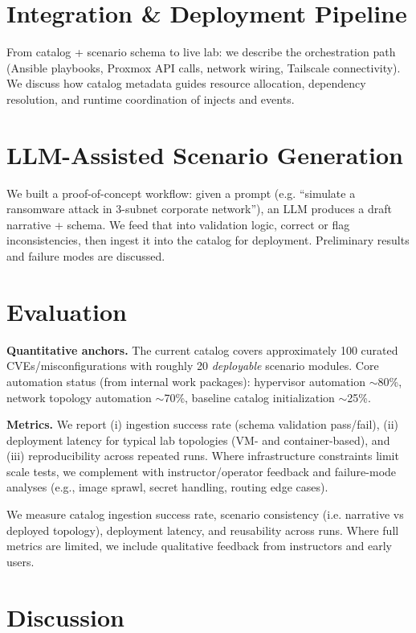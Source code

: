 \documentclass[11pt]{article}
\begin{document}
\section{Integration \& Deployment Pipeline}
From catalog + scenario schema to live lab: we describe the orchestration path (Ansible playbooks, Proxmox API calls, network wiring, Tailscale connectivity). We discuss how catalog metadata guides resource allocation, dependency resolution, and runtime coordination of injects and events.

\section{LLM-Assisted Scenario Generation}
We built a proof-of-concept workflow: given a prompt (e.g. “simulate a ransomware attack in 3-subnet corporate network”), an LLM produces a draft narrative + schema. We feed that into validation logic, correct or flag inconsistencies, then ingest it into the catalog for deployment. Preliminary results and failure modes are discussed.

\section{Evaluation}

\textbf{Quantitative anchors.} The current catalog covers approximately 100 curated CVEs/misconfigurations with roughly 20 \emph{deployable} scenario modules. 
Core automation status (from internal work packages): hypervisor automation $\sim$80\%, network topology automation $\sim$70\%, baseline catalog initialization $\sim$25\%.

\textbf{Metrics.} We report (i) ingestion success rate (schema validation pass/fail), (ii) deployment latency for typical lab topologies (VM- and container-based), and (iii) reproducibility across repeated runs. 
Where infrastructure constraints limit scale tests, we complement with instructor/operator feedback and failure-mode analyses (e.g., image sprawl, secret handling, routing edge cases).

We measure catalog ingestion success rate, scenario consistency (i.e. narrative vs deployed topology), deployment latency, and reusability across runs. Where full metrics are limited, we include qualitative feedback from instructors and early users.

\section{Discussion}
\end{document}
